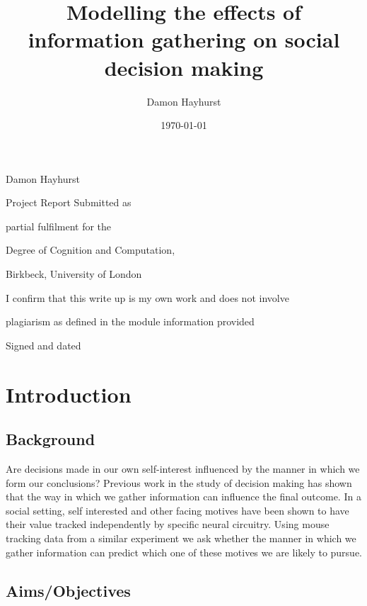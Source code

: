 \documentclass[man, floatsintext]{apa7}
\title{Modelling the effects of information gathering on social decision making}
\author{Damon Hayhurst}
\date{\today}
\makeatletter
\renewcommand{\maketitle}{
	\begin{titlepage}
		\centering
		\vspace*{0.4in}
		{\Huge \bfseries \@title \par}
		\vspace{0.2in}
		{\LARGE Damon Hayhurst \par}
		\vspace{0.3in}
		{\Large Project Report Submitted as\par}
		{\Large partial fulfilment for the\par}
		{\Large Degree of Cognition and Computation,\par}
		\vfill
		{\Large Birkbeck, University of London\par}
		{\Large \@date \par}
		\vfill
		{\Large
			\begin{center}
				I confirm that this write up is my own work and does not involve\par
				plagiarism as defined in the module information provided
			\end{center}
		}
		{\Large Signed and dated\par}
		\vspace{1in}
	\end{titlepage}
}
\makeatother
\begin{document}
\maketitle


\abstract


\section{Introduction}





\subsection{Background}

Are decisions made in our own self-interest influenced by the manner in which we form our conclusions? Previous work in the study of decision making has shown that the way in which we gather information can influence the final outcome. In a social setting, self interested and other facing motives have been shown to have their value tracked independently by specific neural circuitry. Using mouse tracking data from a similar experiment we ask whether the manner in which we gather information can predict which one of these motives we are likely to pursue. 

\subsection{Aims/Objectives}
\end{document}
